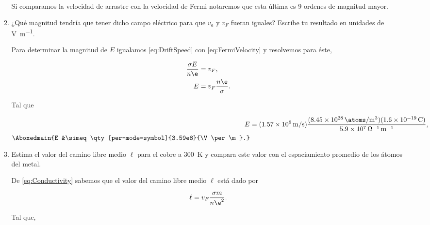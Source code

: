 \documentclass[./../main.tex]{subfiles}
\begin{document}
\begin{enumerate}
\begin{enumerate}[label = (b.\arabic*)]
                        Si comparamos la velocidad de arrastre con la velocidad de Fermi notaremos que esta última es 9 ordenes de magnitud mayor.
                    
                    
                    \color{blue}
                    \item ¿Qué magnitud tendría que tener dicho campo eléctrico para que \(v_{a}\) y \(v_{F}\) fueran iguales? Escribe tu resultado en unidades de \unit{\V\per\m}.
                    \color{black}
                    
                        Para determinar la magnitud de \(E\) igualamos \cref{eq:DriftSpeed} con \cref{eq:FermiVelocity} y resolvemos para éste,

                        \begin{align*}
                            \dfrac{\sigma E}{n\e} &= v_{F},\\
                            E &= v_{F}\dfrac{n\e}{\sigma}.
                        \end{align*}
                        
                        Tal que

                        \begin{align*}
                            E &= (\qty[per-mode=symbol]{1.57e6}{\m\per\s})\dfrac{(\qty[per-mode=symbol]{8.45e28}{\atoms\per\m\cubed})(\qty{1.6e-19}{\C})}{\qty[per-mode=power]{5.9e7}{\per\ohm\per\m}},\\
                            \Aboxedmain{E &\simeq \qty[per-mode=symbol]{3.59e8}{\V\per\m}.}
                        \end{align*}
                    
                    
                    \color{blue}
                    \item Estima el valor del camino libre medio \(\ell\) para el cobre a \qty{300}{\kelvin} y compara este valor con el espaciamiento promedio de los átomos del metal.
                    \color{black}
                    
                        De \cref{eq:Conductivity} sabemos que el valor del camino libre medio \(\ell\) está dado por

                        \begin{equation*}
                            \ell = v_{F}\dfrac{\sigma m}{n\e^{2}}.
                        \end{equation*}

                        Tal que,


\end{enumerate}
\end{enumerate}
\end{document}
